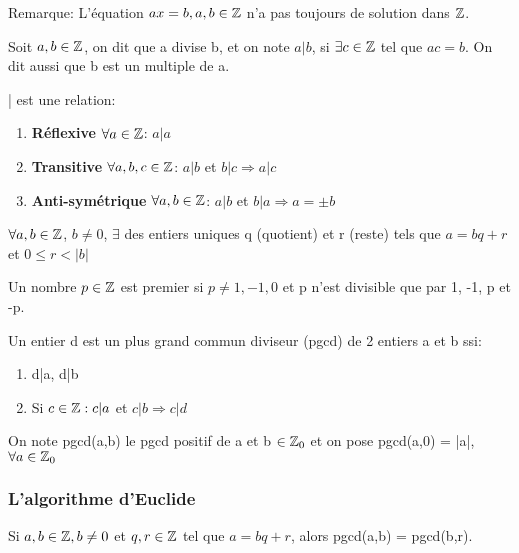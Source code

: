 Remarque: L'équation $ax = b, a,b\in \mathbb{Z}$ n'a pas toujours de solution dans $\mathbb{Z}$.\\

\begin{defn}
Soit $a,b \in \mathbb{Z}$, on dit que a divise b, et on note $a|b$, si $\exists c \in \mathbb{Z}$ tel que $ac=b$. On dit aussi que b est un multiple de a.
\end{defn}

\begin{prop}
| est une relation:

\begin{enumerate}
	\item \textbf{Réflexive} $\forall a \in \mathbb{Z}$: $a|a$
	\item \textbf{Transitive} $\forall a,b,c \in \mathbb{Z}$: $a|b$ et $b|c \Rightarrow a|c$
	\item \textbf{Anti-symétrique} $\forall a,b \in \mathbb{Z}$: $a|b$ et $b|a \Rightarrow a=\pm b$
\end{enumerate}
\end{prop}

\begin{thrm}
$\forall a,b \in \mathbb{Z}$, $b \neq 0$, $\exists$ des entiers uniques q (quotient) et r (reste) tels que $a= bq + r$ et $0 \leq r < |b|$
\end{thrm}

\begin{defn}
Un nombre $p \in \mathbb{Z}$ est premier si $p \neq 1, -1, 0$ et p n'est divisible que par 1, -1, p et -p.
\end{defn}

\begin{defn}
Un entier d est un plus grand commun diviseur (pgcd) de 2 entiers a et b ssi:
\begin{enumerate}
\item d|a, d|b
\item Si $c \in \mathbb{Z}: c|a$ et $c|b \Rightarrow c|d$
\end{enumerate}

On note pgcd(a,b) le pgcd positif de a et b $\in \mathbb{Z}_0$ et on pose pgcd(a,0) = |a|, $\forall a \in \mathbb{Z}_0$
\end{defn}

\subsubsection{L'algorithme d'Euclide}

\begin{prop}
Si $a, b \in \mathbb{Z}, b \neq 0$ et $q,r \in \mathbb{Z}$ tel que $a=bq + r$, alors pgcd(a,b) = pgcd(b,r).
\end{prop}

